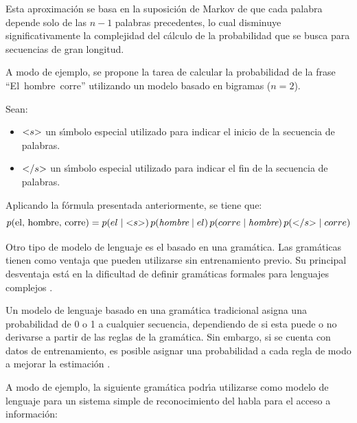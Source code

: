 Esta aproximaci\'on se basa en la suposici\'on de Markov de que cada palabra depende solo de las $n - 1$ palabras precedentes, lo cual disminuye significativamente la complejidad del c\'alculo de la probabilidad que se busca para
secuencias de gran longitud.

A modo de ejemplo, se propone la tarea de calcular la probabilidad de la frase \mbox{``El hombre corre''}
utilizando un modelo basado en bigramas ($n=2$).

Sean:
\begin{itemize}
 	\item $\text{\textless} s\text{\textgreater}$ un s{\'\i}mbolo especial utilizado para indicar el inicio 
 	de la secuencia de palabras.
  	\item $\text{\textless} /s\text{\textgreater}$ un s{\'\i}mbolo especial utilizado para indicar el fin 
  	de la secuencia de palabras.
\end{itemize} 

Aplicando la f\'ormula presentada anteriormente, se tiene que:
\begin{equation*}
p(\text{el, hombre, corre}) = p(el \mid \text{\textless} s\text{\textgreater}) \, 
p(\emph{\text{hombre}} \mid el) \, p(corre \mid \emph{\text{hombre}}) \, 
p(\text{\textless} /s\text{\textgreater} \mid corre)
\end{equation*}


Otro tipo de modelo de lenguaje es el basado en una gram\'atica. Las gram\'aticas tienen como ventaja que pueden
utilizarse sin entrenamiento previo. Su principal desventaja est\'a en la dificultad de definir gram\'aticas formales
para lenguajes complejos \cite{Wang2000}.

Un modelo de lenguaje basado en una gram\'atica tradicional asigna una probabilidad de 0 o 1 a cualquier secuencia,
dependiendo de si esta puede o no derivarse a partir de las reglas de la gram\'atica. Sin embargo, si se cuenta con
datos de entrenamiento, es posible asignar una probabilidad a cada regla de modo a mejorar 
la estimaci\'on \cite{huang-handbook10}.

A modo de ejemplo, la siguiente gram\'atica podr{\'\i}a utilizarse como modelo de lenguaje para un sistema simple
de reconocimiento del habla para el acceso a informaci\'on:

\begin{bnf*}
{ \bnfsp {} \bnfsp {}  \bnfsp  {} \bnfsp {}} \\
{ \bnfor {} \bnfor {}} \\
{ \bnfor {} \bnfor {}}
\end{bnf*}

